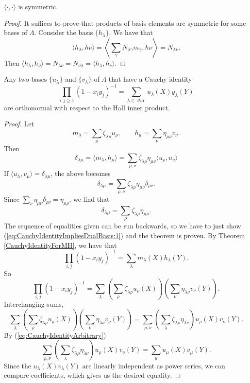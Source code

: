\documentclass{article}
\DeclareMathOperator{\Par}{Par}
\begin{document}
\begin{theorem}
    $\langle\cdot,\cdot\rangle$ is symmetric.
\end{theorem}

\begin{proof}
    It suffices to prove that products of basis elements are symmetric for some bases of $\Lambda$. Consider the basis $\{h_\lambda\}$. We have that
    \[
        \langle h_\lambda, h\nu \rangle = \left\langle \sum_{\gamma} N_{\lambda\gamma} m_\gamma, h\nu \right\rangle = N_{\lambda\nu}.
    \]
    Then $\langle h_\lambda, h_\nu \rangle = N_{\lambda\nu} = N_{\nu\lambda} = \langle h_\lambda, h_\nu \rangle$.
\end{proof}

\begin{theorem}\label{thm:CauchyIdentityImpliesOrthonormal}
    Any two bases $\{u_\lambda\}$ and $\{v_\lambda\}$ of $\Lambda$ that have a Cauchy identity
    \begin{equation}\label{eq:CauchyIdentityArbitrary}
        \prod_{i,j \geq 1}(1 - x_iy_j)^{-1} = \sum_{\lambda\in\Par} u_\lambda(X) y_\lambda(Y)
    \end{equation}
    are orthonormal with respect to the Hall inner product.
\end{theorem}

\begin{proof}
    Let
    \[
        m_\lambda = \sum_\rho \zeta_{\lambda\rho} u_\rho, \qquad h_\mu = \sum_\nu \eta_{\mu\nu} v_\nu.
    \]
    Then
    \[
        \delta_{\lambda\mu} = \langle m_\lambda, h_\mu \rangle = \sum_{\rho,\nu}\zeta_{\lambda\rho} \eta_{\mu\nu} \langle u_\rho, u_\nu \rangle
    \]
    If $\langle u_\lambda, v_\mu \rangle = \delta_{\lambda\mu}$, the above becomes
    \[
        \delta_{\lambda\mu} =  \sum_{\rho,\nu}\zeta_{\lambda\rho} \eta_{\mu\nu} \delta_{\rho\nu}.
    \]
    Since $\sum_\nu \eta_{\mu\nu}\delta_{\rho\nu} = \eta_{\mu\rho}$, we find that
    \begin{equation}\label{eq:CauchyIdentityImpliesDualBasis:1}
        \delta_{\lambda\mu} =  \sum_\rho\zeta_{\lambda\rho} \eta_{\mu\rho}.
    \end{equation}
    The sequence of equalities given can be run backwards, so we have to just show (\ref{eq:CauchyIdentityImpliesDualBasis:1}) and the theorem is proven.
    By Theorem \ref{CauchyIdentityForMH}, we have that
    \[
        \prod_{i,j}(1-x_iy_j)^{-1} = \sum_\lambda m_\lambda(X) h_\lambda(Y).
    \]
    So 
    \[
        \prod_{i,j}(1-x_iy_j)^{-1} = \sum_\lambda \left(\sum_\rho \zeta_{\lambda\rho} u_\rho(X)\right)\left(\sum_\nu \eta_{\lambda\nu}v_\nu(Y)\right).
    \]
    Interchanging sums,
    \[
        \sum_\lambda \left(\sum_\rho \zeta_{\lambda\rho} u_\rho(X)\right)\left(\sum_\nu \eta_{\lambda\nu}v_\nu(Y)\right) = \sum_{\rho,\nu} \left(\sum_\lambda \zeta_{\lambda\rho} \eta_{\lambda\nu}\right) u_\rho(X) v_\nu(Y).
    \]
    By (\ref{eq:CauchyIdentityArbitrary})
    \[
        \sum_{\rho,\nu} \left(\sum_\lambda \zeta_{\lambda\rho} \eta_{\lambda\nu}\right) u_\rho(X) v_\nu(Y) = \sum_\mu u_\mu(X) v_\mu(Y).
    \]
    Since the $u_\lambda(X)v_\lambda(Y)$ are linearly independent as power series, we can compare coefficients, which gives us the desired equality.
\end{proof}
\end{document}
